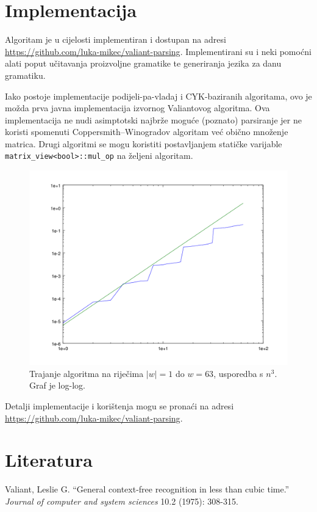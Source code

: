 \documentclass[a4paper,oneside,12pt]{article} %
\begin{document}
    \section{Implementacija}
    
    Algoritam je u cijelosti implementiran i dostupan na adresi
        \url{https://github.com/luka-mikec/valiant-parsing}.
    Implementirani su i neki pomoćni alati poput učitavanja proizvoljne gramatike
        te generiranja jezika za danu gramatiku.
        
    Iako postoje implementacije podijeli-pa-vladaj i CYK-baziranih algoritama,
        ovo je možda prva javna implementacija izvornog Valiantovog algoritma.
    Ova implementacija ne nudi asimptotski najbrže moguće (poznato) parsiranje 
        jer ne koristi spomenuti Coppersmith–Winogradov	
        algoritam već obično množenje matrica. 
    Drugi algoritmi se mogu koristiti postavljanjem statičke varijable
        \verb|matrix_view<bool>::mul_op| na željeni algoritam.
        
    \begin{figure}
        \centering
        \includegraphics[scale=0.5]{graf.png}
        \caption{\small Trajanje algoritma na riječima $|w| = 1$ do $w = 63$, usporedba s $n^3$. 
            Graf je log-log.}
    \end{figure}
        
    Detalji implementacije i korištenja mogu se pronaći na adresi
        \url{https://github.com/luka-mikec/valiant-parsing}.
        
    
    \section{Literatura}

    \noindent Valiant, Leslie G. ``General context-free recognition in less than cubic time.'' 
    \emph{Journal of computer and system sciences} 10.2 (1975): 308-315.
\end{document}
